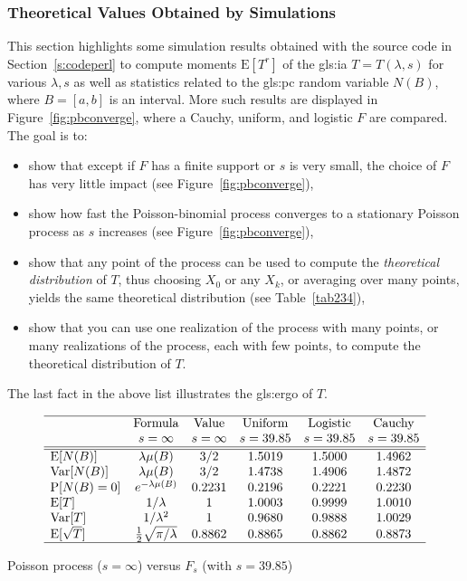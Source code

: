 \documentclass[10pt]{article}
\begin{document}
\subsubsection{Theoretical Values Obtained by Simulations}

This section highlights some simulation results obtained with the source code in Section~\ref{s:codeperl} to compute moments $\mbox{E}[T^r]$
of the \gls{gls:ia} $T=T(\lambda,s)$ for various $\lambda,s$ as well as statistics related to the
\gls{gls:pc} random variable $N(B)$, where
$B=[a,b]$ is an interval.  More such results are displayed in Figure~\ref{fig:pbconverge}, where a Cauchy, uniform, and logistic $F$ are compared.   The goal is to:
\begin{itemize}
\item show that except if $F$ has a finite support or $s$ is very small, the choice of $F$ has very little impact (see Figure~\ref{fig:pbconverge}),
\item show how fast the Poisson-binomial process converges to a stationary Poisson process as $s$ increases (see Figure~\ref{fig:pbconverge}),
\item show that any point of the process can be used to compute the {\em theoretical distribution} of $T$, thus choosing $X_0$ or any $X_k$, or averaging over many points, yields the same theoretical distribution (see Table~\ref{tab234}),
\item show that you can use one realization of the process with many points, or many realizations of the process, each with few points,
to compute the theoretical distribution of $T$.
\end{itemize}
\noindent The last fact in the above list illustrates the \gls{gls:ergo} of $T$.

\begin{table}[H]
\[
\begin{array}{lccccc}
\hline
   & \mbox{Formula} & \mbox{Value} & \mbox{Uniform} & \mbox{Logistic} & \mbox{Cauchy}  \\
  &  s=\infty & s=\infty & s=39.85 & s=39.85 & s=39.85  \\
\hline
\hline
\mbox{E}[N(B)]    &  \lambda \mu(B)&  3/2 &  1.5019  & 1.5000 & 1.4962  \\
\mbox{Var}[N(B)]   &  \lambda \mu(B) & 3/2 & 1.4738 & 1.4906 & 1.4872   \\
\mbox{P}[N(B)=0]   & e^{-\lambda \mu(B)} & 0.2231  &   0.2196 & 0.2221 & 0.2230 \\
\mbox{E}[T]   &  1/\lambda & 1 & 1.0003 & 0.9999 & 1.0010  \\
 \mbox{Var}[T]  & 1/\lambda^2 & 1 &  0.9680 & 0.9888  & 1.0029  \\
\mbox{E}[\sqrt{T}]   & \frac{1}{2} \sqrt{\pi/\lambda} & 0.8862 &   0.8865 & 0.8862 & 0.8873\\
\hline
\end{array}
\]
\caption{\label{tab124}Poisson process ($s=\infty$) versus $F_s$ (with $s=39.85$)}
\end{table}
\end{document}
